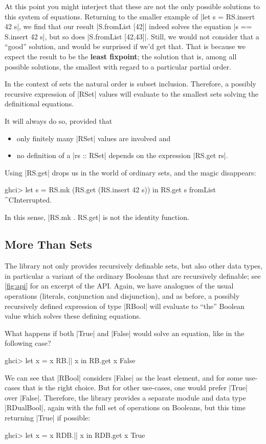 \documentclass[manuscript,screen,acmsmall,nonacm]{acmart}
\begin{document}
At this point you might interject that these are not the only possible solutions to this system of equations. Returning to the smaller example of |let s = RS.insert 42 s|, we find that our result |S.fromList [42]| indeed solves the equation |s == S.insert 42 s|, but so does |S.fromList [42,43]|. Still, we would not consider that a “good” solution, and would be surprised if we'd get that.
%
That is because we expect the result to be the \textbf{least fixpoint}; the solution that is, among all possible solutions, the smallest with regard to a particular partial order.

In the context of sets the natural order is subset inclusion. Therefore, a possibly recursive expression of |RSet| values will evaluate to the smallest sets solving the definitional equations.

It will always do so, provided that
\begin{itemize}
\item only finitely many |RSet| values are involved and
\item no definition of a |rs :: RSet| depends on the expression |RS.get rs|.
\end{itemize}
Using |RS.get| drops us in the world of ordinary sets, and the magic disappears:
\begin{code}
ghci> let s = RS.mk (RS.get (RS.insert 42 s)) in RS.get s
fromList ^CInterrupted.
\end{code}
In this sense, |RS.mk . RS.get| is not the identity function.

\subsection{More Than Sets}

The library not only provides recursively definable sets, but also other data types, in particular a variant of the ordinary Booleans that are recursively definable; see \cref{fig:api} for an excerpt of the API. Again, we have analogues of the usual operations (literals, conjunction and disjunction), and as before, a possibly recursively defined expression of type |RBool| will evaluate to “the” Boolean value which solves these defining equations.

What happens if both |True| and |False| would solve an equation, like in the following case?
\begin{code}
ghci> let x = x RB.|| x in RB.get x
False
\end{code}
We can see that |RBool| considers |False| as the least element, and for some use-cases that is the right choice. But for other use-cases, one would prefer |True| over |False|. Therefore, the library provides a separate module and data type |RDualBool|, again with the full set of operations on Booleans, but this time returning |True| if possible:
\begin{code}
ghci> let x = x RDB.|| x in RDB.get x
True
\end{code}
\end{document}
